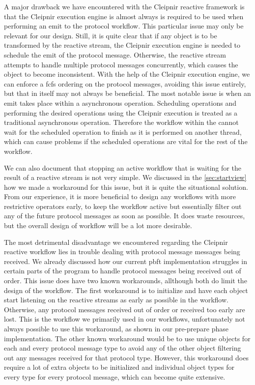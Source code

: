 A major drawback we have encountered with the Cleipnir reactive framework is that the Cleipnir execution engine is almost always is required to be used when performing an emit to the protocol workflow. This particular issue may only be relevant for our design. Still, it is quite clear that if any object is to be transformed by the reactive stream, the Cleipnir execution engine is needed to schedule the emit of the protocol message. Otherwise, the reactive stream attempts to handle multiple protocol messages concurrently, which causes the object to become inconsistent. With the help of the Cleipnir execution engine, we can enforce a \ac{fcfs} ordering on the protocol messages, avoiding this issue entirely, but that in itself may not always be beneficial. The most notable issue is when an emit takes place within a  asynchronous operation. Scheduling operations and performing the desired operations using the Cleipnir execution is treated as a traditional asynchronous operation. Therefore the workflow within the  cannot wait for the scheduled operation to finish as it is performed on another thread, which can cause problems if the scheduled operations are vital for the rest of the workflow. 

We can also document that stopping an active workflow that is waiting for the result of a reactive stream is not very simple. We discussed in the \autoref{sec:startview} how we made a workaround for this issue, but it is quite the situational solution. From our experience, it is more beneficial to design any workflows with more restrictive  operators early, to keep the workflow active but essentially filter out any of the future protocol messages as soon as possible. It does waste resources, but the overall design of workflow will be a lot more desirable. 

The most detrimental disadvantage we encountered regarding the Cleipnir reactive workflow lies in trouble dealing with protocol message messages being received. We already discussed how our current \ac{pbft} implementation struggles in certain parts of the program to handle protocol messages being received out of order. This issue does have two known workarounds, allthough both do limit the design of the workflow. The first workaround is to initialize and have each  object start listening on the reactive streams as early as possible in the workflow. Otherwise, any protocol messages received out of order or received too early are lost. This is the workflow we primarily used in our workflows, unfortunately not always possible to use this workaround, as shown in our pre-prepare phase implementation. The other known workaround would be to use unique  objects for each and every protocol message type to avoid any of the other  object filtering out any messages received for that protocol type. However, this workaround does require a lot of extra  objects to be initialized and individual object types for every type for every protocol message, which can become quite extensive.

